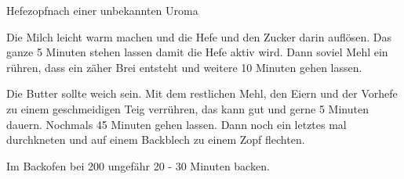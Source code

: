 \begin{recipe}{Hefezopf}{nach einer unbekannten Uroma}
  \label{Hefezopf}
  \inglist

  \steps
  Die Milch leicht warm machen und die Hefe und den Zucker darin auflösen. Das
  ganze 5 Minuten stehen lassen damit die Hefe aktiv wird. Dann soviel Mehl
  ein rühren, dass ein zäher Brei entsteht und weitere 10 Minuten gehen lassen.

  Die Butter sollte weich sein. Mit dem restlichen Mehl, den Eiern und der
  Vorhefe zu einem geschmeidigen Teig verrühren, das kann gut und gerne 5
  Minuten dauern. Nochmals 45 Minuten gehen lassen. Dann noch ein letztes mal
  durchkneten und auf einem Backblech zu einem Zopf flechten.

  Im Backofen bei 200 \celsius ungefähr 20 - 30 Minuten backen.
\end{recipe}
